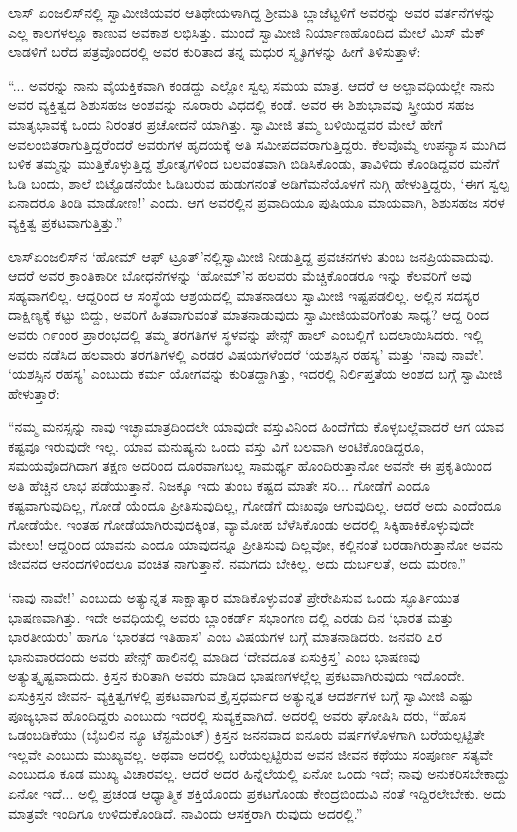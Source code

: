 ಲಾಸ್ ಏಂಜಲಿಸ್​ನಲ್ಲಿ ಸ್ವಾಮೀಜಿಯವರ ಆತಿಥೇಯಳಾಗಿದ್ದ ಶ್ರೀಮತಿ ಬ್ಲಾಜೆಟ್ಟಳಿಗೆ ಅವರನ್ನು ಅವರ ವರ್ತನೆಗಳನ್ನು ಎಲ್ಲ ಕಾಲಗಳಲ್ಲೂ ಕಾಣುವ ಅವಕಾಶ ಲಭಿಸಿತ್ತು. ಮುಂದೆ ಸ್ವಾಮೀಜಿ ನಿರ್ಯಾಣಹೊಂದಿದ ಮೇಲೆ ಮಿಸ್ ಮೆಕ್​ಲಾಡಳಿಗೆ ಬರೆದ ಪತ್ರವೊಂದರಲ್ಲಿ ಅವರ ಕುರಿತಾದ ತನ್ನ ಮಧುರ ಸ್ಮೃತಿಗಳನ್ನು ಹೀಗೆ ತಿಳಿಸುತ್ತಾಳೆ:

“... ಅವರನ್ನು ನಾನು ವೈಯಕ್ತಿಕವಾಗಿ ಕಂಡದ್ದು ಎಲ್ಲೋ ಸ್ವಲ್ಪ ಸಮಯ ಮಾತ್ರ. ಆದರೆ ಆ ಅಲ್ಪಾವಧಿಯಲ್ಲೇ ನಾನು ಅವರ ವ್ಯಕ್ತಿತ್ವದ ಶಿಶುಸಹಜ ಅಂಶವನ್ನು ನೂರಾರು ವಿಧದಲ್ಲಿ ಕಂಡೆ. ಅವರ ಈ ಶಿಶುಭಾವವು ಸ್ತ್ರೀಯರ ಸಹಜ ಮಾತೃಭಾವಕ್ಕೆ ಒಂದು ನಿರಂತರ ಪ್ರಚೋದನೆ ಯಾಗಿತ್ತು. ಸ್ವಾಮೀಜಿ ತಮ್ಮ ಬಳಿಯಿದ್ದವರ ಮೇಲೆ ಹೇಗೆ ಅವಲಂಬಿತರಾಗುತ್ತಿದ್ದರೆಂದರೆ ಅವರುಗಳ ಹೃದಯಕ್ಕೆ ಅತಿ ಸಮೀಪದವರಾಗುತ್ತಿದ್ದರು. ಕೆಲವೊಮ್ಮೆ ಉಪನ್ಯಾಸ ಮುಗಿದ ಬಳಿಕ ತಮ್ಮನ್ನು ಮುತ್ತಿಕೊಳ್ಳುತ್ತಿದ್ದ ಶ್ರೋತೃಗಳಿಂದ ಬಲವಂತವಾಗಿ ಬಿಡಿಸಿಕೊಂಡು, ತಾವಿಳಿದು ಕೊಂಡಿದ್ದವರ ಮನೆಗೆ ಓಡಿ ಬಂದು, ಶಾಲೆ ಬಿಟ್ಟೊಡನೆಯೇ ಓಡಿಬರುವ ಹುಡುಗನಂತೆ ಅಡಿಗೆಮನೆಯೊಳಗೆ ನುಗ್ಗಿ ಹೇಳುತ್ತಿದ್ದರು, ‘ಈಗ ಸ್ವಲ್ಪ ಏನಾದರೂ ತಿಂಡಿ ಮಾಡೋಣ!’ ಎಂದು. ಆಗ ಅವರಲ್ಲಿನ ಪ್ರವಾದಿಯೂ ಪುಷಿಯೂ ಮಾಯವಾಗಿ, ಶಿಶುಸಹಜ ಸರಳ ವ್ಯಕ್ತಿತ್ವ ಪ್ರಕಟವಾಗುತ್ತಿತ್ತು.”

ಲಾಸ್​ಏಂಜಲಿಸ್​ನ ‘ಹೋಮ್ ಆಫ್ ಟ್ರೂತ್​’ನಲ್ಲಿಸ್ವಾಮೀಜಿ ನೀಡುತ್ತಿದ್ದ ಪ್ರವಚನಗಳು ತುಂಬ ಜನಪ್ರಿಯವಾದುವು. ಆದರೆ ಅವರ ಕ್ರಾಂತಿಕಾರೀ ಬೋಧನೆಗಳನ್ನು ‘ಹೋಮ್​’ನ ಹಲವರು ಮೆಚ್ಚಿಕೊಂಡರೂ ಇನ್ನು ಕೆಲವರಿಗೆ ಅವು ಸಹ್ಯವಾಗಲಿಲ್ಲ. ಆದ್ದರಿಂದ ಆ ಸಂಸ್ಥೆಯ ಆಶ್ರಯದಲ್ಲಿ ಮಾತನಾಡಲು ಸ್ವಾಮೀಜಿ ಇಷ್ಟಪಡಲಿಲ್ಲ. ಅಲ್ಲಿನ ಸದಸ್ಯರ ದಾಕ್ಷಿಣ್ಯಕ್ಕೆ ಕಟ್ಟು ಬಿದ್ದು, ಅವರಿಗೆ ಹಿತವಾಗುವಂತೆ ಮಾತನಾಡುವುದು ಸ್ವಾಮೀಜಿಯವರಿಗೆಂತು ಸಾಧ್ಯ? ಆದ್ದ ರಿಂದ ಅವರು ೧೯ಂಂರ ಪ್ರಾರಂಭದಲ್ಲಿ ತಮ್ಮ ತರಗತಿಗಳ ಸ್ಥಳವನ್ನು ಪೇನ್ಸ್ ಹಾಲ್ ಎಂಬಲ್ಲಿಗೆ ಬದಲಾಯಿಸಿದರು. ಇಲ್ಲಿ ಅವರು ನಡೆಸಿದ ಹಲವಾರು ತರಗತಿಗಳಲ್ಲಿ ಎರಡರ ವಿಷಯಗಳೆಂದರೆ ‘ಯಶಸ್ಸಿನ ರಹಸ್ಯ’ ಮತ್ತು ‘ನಾವು ನಾವೇ’. ‘ಯಶಸ್ಸಿನ ರಹಸ್ಯ’ ಎಂಬುದು ಕರ್ಮ ಯೋಗವನ್ನು ಕುರಿತದ್ದಾಗಿತ್ತು, ಇದರಲ್ಲಿ ನಿರ್ಲಿಪ್ತತೆಯ ಅಂಶದ ಬಗ್ಗೆ ಸ್ವಾಮೀಜಿ ಹೇಳುತ್ತಾರೆ:

“ನಮ್ಮ ಮನಸ್ಸನ್ನು ನಾವು ಇಚ್ಛಾಮಾತ್ರದಿಂದಲೇ ಯಾವುದೇ ವಸ್ತುವಿನಿಂದ ಹಿಂದೆಗೆದು ಕೊಳ್ಳಬಲ್ಲೆವಾದರೆ ಆಗ ಯಾವ ಕಷ್ಟವೂ ಇರುವುದೇ ಇಲ್ಲ. ಯಾವ ಮನುಷ್ಯನು ಒಂದು ವಸ್ತು ವಿಗೆ ಬಲವಾಗಿ ಅಂಟಿಕೊಂಡಿದ್ದರೂ, ಸಮಯವೊದಗಿದಾಗ ತಕ್ಷಣ ಅದರಿಂದ ದೂರವಾಗಬಲ್ಲ ಸಾಮರ್ಥ್ಯ ಹೊಂದಿರುತ್ತಾನೋ ಅವನೇ ಈ ಪ್ರಕೃತಿಯಿಂದ ಅತಿ ಹೆಚ್ಚಿನ ಲಾಭ ಪಡೆಯುತ್ತಾನೆ. ನಿಜಕ್ಕೂ ಇದು ತುಂಬ ಕಷ್ಟದ ಮಾತೇ ಸರಿ... ಗೋಡೆಗೆ ಎಂದೂ ಕಷ್ಟವಾಗುವುದಿಲ್ಲ, ಗೋಡೆ ಯೆಂದೂ ಪ್ರೀತಿಸುವುದಿಲ್ಲ, ಗೋಡೆಗೆ ದುಃಖವೂ ಆಗುವುದಿಲ್ಲ. ಆದರೆ ಅದು ಎಂದೆಂದೂ ಗೋಡೆಯೇ. ಇಂತಹ ಗೋಡೆಯಾಗಿರುವುದಕ್ಕಿಂತ, ವ್ಯಾಮೋಹ ಬೆಳೆಸಿಕೊಂಡು ಅದರಲ್ಲಿ ಸಿಕ್ಕಿಹಾಕಿಕೊಳ್ಳುವುದೇ ಮೇಲು! ಆದ್ದರಿಂದ ಯಾವನು ಎಂದೂ ಯಾವುದನ್ನೂ ಪ್ರೀತಿಸುವು ದಿಲ್ಲವೋ, ಕಲ್ಲಿನಂತೆ ಬರಡಾಗಿರುತ್ತಾನೋ ಅವನು ಜೀವನದ ಆನಂದಗಳಿಂದಲೂ ವಂಚಿತ ನಾಗುತ್ತಾನೆ. ನಮಗದು ಬೇಕಿಲ್ಲ. ಅದು ದುರ್ಬಲತೆ, ಅದು ಮರಣ.”

‘ನಾವು ನಾವೇ!’ ಎಂಬುದು ಅತ್ಯುನ್ನತ ಸಾಕ್ಷಾತ್ಕಾರ ಮಾಡಿಕೊಳ್ಳುವಂತೆ ಪ್ರೇರೇಪಿಸುವ ಒಂದು ಸ್ಫೂರ್ತಿಯುತ ಭಾಷಣವಾಗಿತ್ತು. ಇದೇ ಅವಧಿಯಲ್ಲಿ ಅವರು ಬ್ಲಾಂಕರ್ಡ್ ಸಭಾಂಗಣ ದಲ್ಲಿ ಎರಡು ದಿನ ‘ಭಾರತ ಮತ್ತು ಭಾರತೀಯರು’ ಹಾಗೂ ‘ಭಾರತದ ಇತಿಹಾಸ’ ಎಂಬ ವಿಷಯಗಳ ಬಗ್ಗೆ ಮಾತನಾಡಿದರು. ಜನವರಿ ೭ರ ಭಾನುವಾರದಂದು ಅವರು ಪೇನ್ಸ್ ಹಾಲಿನಲ್ಲಿ ಮಾಡಿದ ‘ದೇವದೂತ ಏಸುಕ್ರಿಸ್ತ’ ಎಂಬ ಭಾಷಣವು ಅತ್ಯುತ್ಕೃಷ್ಟವಾದುದು. ಕ್ರಿಸ್ತನ ಕುರಿತಾಗಿ ಅವರು ಮಾಡಿದ ಭಾಷಣಗಳಲ್ಲೆಲ್ಲ ಪ್ರಕಟವಾಗಿರುವುದು ಇದೊಂದೇ. ಏಸುಕ್ರಿಸ್ತನ ಜೀವನ- ವ್ಯಕ್ತಿತ್ವಗಳಲ್ಲಿ ಪ್ರಕಟವಾಗುವ ಕ್ರೈಸ್ತಧರ್ಮದ ಅತ್ಯುನ್ನತ ಆದರ್ಶಗಳ ಬಗ್ಗೆ ಸ್ವಾಮೀಜಿ ಎಷ್ಟು ಪೂಜ್ಯಭಾವ ಹೊಂದಿದ್ದರು ಎಂಬುದು ಇದರಲ್ಲಿ ಸುವ್ಯಕ್ತವಾಗಿದೆ. ಅದರಲ್ಲಿ ಅವರು ಘೋಷಿಸಿ ದರು, “ಹೊಸ ಒಡಂಬಡಿಕೆಯು (ಬೈಬಲಿನ ನ್ಯೂ ಟೆಸ್ಟಮೆಂಟ್​) ಕ್ರಿಸ್ತನ ಜನನವಾದ ಐನೂರು ವರ್ಷಗಳೊಳಗಾಗಿ ಬರೆಯಲ್ಪಟ್ಟಿತೇ ಇಲ್ಲವೇ ಎಂಬುದು ಮುಖ್ಯವಲ್ಲ. ಅಥವಾ ಅದರಲ್ಲಿ ಬರೆಯಲ್ಪಟ್ಟಿರುವ ಅವನ ಜೀವನ ಕಥೆಯು ಸಂಪೂರ್ಣ ಸತ್ಯವೇ ಎಂಬುದೂ ಕೂಡ ಮುಖ್ಯ ವಿಚಾರವಲ್ಲ. ಆದರೆ ಅದರ ಹಿನ್ನೆಲೆಯಲ್ಲಿ ಏನೋ ಒಂದು ಇದೆ; ನಾವು ಅನುಕರಿಸಬೇಕಾದ್ದು ಏನೋ ಇದೆ... ಅಲ್ಲಿ ಪ್ರಚಂಡ ಆಧ್ಯಾತ್ಮಿಕ ಶಕ್ತಿಯೊಂದು ಪ್ರಕಟಗೊಂಡು ಕೇಂದ್ರಬಿಂದುವಿ ನಂತೆ ಇದ್ದಿರಲೇಬೇಕು. ಅದು ಮಾತ್ರವೇ ಇಂದಿಗೂ ಉಳಿದುಕೊಂಡಿದೆ. ನಾವಿಂದು ಆಸಕ್ತರಾಗಿ ರುವುದು ಅದರಲ್ಲಿ.”

